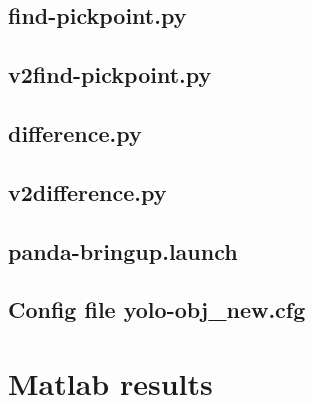 \section{find-pickpoint.py}\label{sec:findpickpoint}

\clearpage

\section{v2find-pickpoint.py}\label{sec:v2findpickpoint}

\clearpage

\section{difference.py}\label{sec:difference}

\clearpage

\section{v2difference.py}\label{sec:v2difference}

\clearpage

\section{panda-bringup.launch}\label{sec:pandabringup}

\clearpage
\section{Config file yolo-obj\_new.cfg}\label{sec:config}

\clearpage

\chapter{Matlab results}
